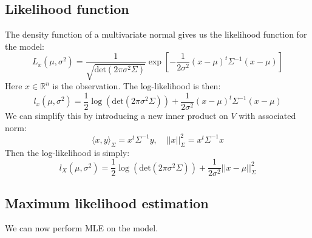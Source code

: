 \documentclass[12pt, a4paper]{article}
\begin{document}
\subsection{Likelihood function}
The density function of a multivariate normal gives us the likelihood function for the model:
\begin{equation}
L_x(\mu,\sigma^2)=\frac{1}{\sqrt{\textrm{det}(2\pi\sigma^2\Sigma)}}\exp\left[-\frac{1}{2\sigma^2}(x-\mu)^t\Sigma^{-1}(x-\mu)\right]
\end{equation}
Here $x\in\mathbb{R}^n$ is the observation. The log-likelihood is then:
\begin{equation}
l_x(\mu,\sigma^2)=\frac{1}{2}\log\left(\textrm{det}(2\pi\sigma^2\Sigma)\right)+\frac{1}{2\sigma^2}(x-\mu)^t\Sigma^{-1}(x-\mu)
\end{equation}
We can simplify this by introducing a new inner product on $V$ with associated norm:
\begin{equation}
\langle x,y\rangle_\Sigma=x^t\Sigma^{-1}y,\quad ||x||^2_\Sigma=x^t\Sigma^{-1}x
\end{equation}
Then the log-likelihood is simply:
\begin{equation}
l_X(\mu,\sigma^2)=\frac{1}{2}\log\left(\textrm{det}(2\pi\sigma^2\Sigma)\right)+\frac{1}{2\sigma^2}||x-\mu||^2_\Sigma
\end{equation}

\subsection{Maximum likelihood estimation}
We can now perform MLE on the model. 
\end{document}
